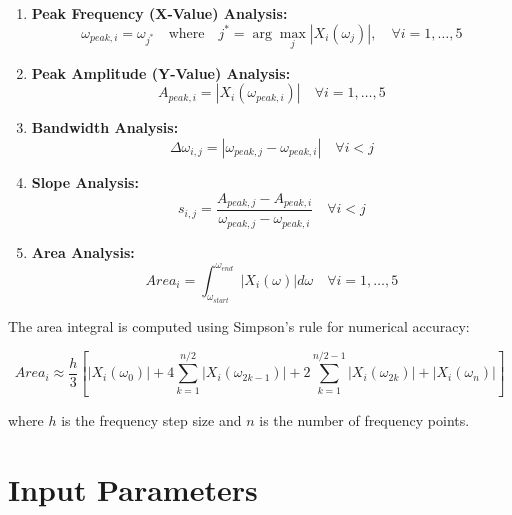 \documentclass[12pt,a4paper]{article}
\begin{document}
\begin{enumerate}
    \item \textbf{Peak Frequency (X-Value) Analysis:}
    \begin{equation}\label{Eq.peak_frequency_analysis_detailed}
    \omega_{peak,i} = \omega_{j^*} \quad \text{where} \quad j^* = \arg\max_{j} |X_i(\omega_j)|, \quad \forall i = 1,\ldots,5
    \end{equation}

    \item \textbf{Peak Amplitude (Y-Value) Analysis:}
    \begin{equation}\label{Eq.peak_amplitude_analysis_detailed}
    A_{peak,i} = |X_i(\omega_{peak,i})| \quad \forall i = 1,\ldots,5
    \end{equation}

    \item \textbf{Bandwidth Analysis:}
    \begin{equation}\label{Eq.bandwidth_analysis_detailed}
    \Delta\omega_{i,j} = |\omega_{peak,j} - \omega_{peak,i}| \quad \forall i < j
    \end{equation}

    \item \textbf{Slope Analysis:}
    \begin{equation}\label{Eq.slope_analysis_detailed}
    s_{i,j} = \frac{A_{peak,j} - A_{peak,i}}{\omega_{peak,j} - \omega_{peak,i}} \quad \forall i < j
    \end{equation}

    \item \textbf{Area Analysis:}
    \begin{equation}\label{Eq.area_analysis_detailed}
    Area_i = \int_{\omega_{start}}^{\omega_{end}} |X_i(\omega)| d\omega \quad \forall i = 1,\ldots,5
\end{equation}
\end{enumerate}

The area integral is computed using Simpson's rule for numerical accuracy:

\begin{equation}\label{Eq.area_simpson_detailed}
Area_i \approx \frac{h}{3} \left[|X_i(\omega_0)| + 4\sum_{k=1}^{n/2} |X_i(\omega_{2k-1})| + 2\sum_{k=1}^{n/2-1} |X_i(\omega_{2k})| + |X_i(\omega_n)| \right]
\end{equation}

where $h$ is the frequency step size and $n$ is the number of frequency points.


\section{Input Parameters}
\label{sec:input-parameters}
\end{document}
